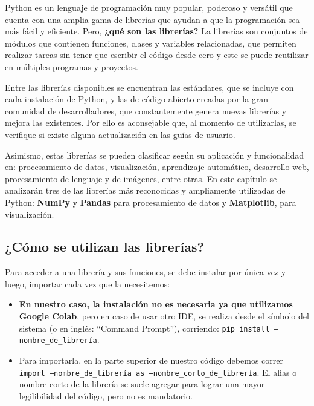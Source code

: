 \documentclass[
  letterpaper,
  DIV=11,
  numbers=noendperiod]{scrreprt}
\begin{document}
Python es un lenguaje de programación muy popular, poderoso y versátil
que cuenta con una amplia gama de librerías que ayudan a que la
programación sea más fácil y eficiente. Pero, \textbf{¿qué son las
librerías?} La librerías son conjuntos de módulos que contienen
funciones, clases y variables relacionadas, que permiten realizar tareas
sin tener que escribir el código desde cero y este se puede reutilizar
en múltiples programas y proyectos.

Entre las librerías disponibles se encuentran las estándares, que se
incluye con cada instalación de Python, y las de código abierto creadas
por la gran comunidad de desarrolladores, que constantemente genera
nuevas librerías y mejora las existentes. Por ello es aconsejable que,
al momento de utilizarlas, se verifique si existe alguna actualización
en las guías de usuario.

Asimismo, estas librerías se pueden clasificar según su aplicación y
funcionalidad en: procesamiento de datos, visualización, aprendizaje
automático, desarrollo web, procesamiento de lenguaje y de imágenes,
entre otras. En este capítulo se analizarán tres de las librerías más
reconocidas y ampliamente utilizadas de Python: \textbf{NumPy} y
\textbf{Pandas} para procesamiento de datos y \textbf{Matplotlib}, para
visualización.

\subsection{¿Cómo se utilizan las
librerías?}\label{cuxf3mo-se-utilizan-las-libreruxedas}

Para acceder a una librería y sus funciones, se debe instalar por única
vez y luego, importar cada vez que la necesitemos:

\begin{itemize}
\item
  \textbf{En nuestro caso, la instalación no es necesaria ya que
  utilizamos Google Colab}, pero en caso de usar otro IDE, se realiza
  desde el símbolo del sistema (o en inglés: ``Command Prompt''),
  corriendo: \texttt{pip\ install\ –nombre\_de\_librería}.
\item
  Para importarla, en la parte superior de nuestro código debemos correr
  \texttt{import\ –nombre\_de\_librería\ as\ –nombre\_corto\_de\_librería}.
  El alias o nombre corto de la librería se suele agregar para lograr
  una mayor legilibilidad del código, pero no es mandatorio.
\end{itemize}
\end{document}
